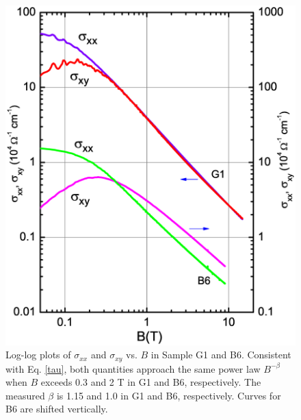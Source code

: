 \begin{figure}[!htbp]
  \begin{center}
\includegraphics[width=0.8\linewidth]{ch-na3bi/figures/FigLogSigxy}
\caption{\label{figCond} 
Log-log plots of $\sigma_{xx}$ and $\sigma_{xy}$ vs. $B$ in Sample G1 and B6. Consistent with Eq. \ref{tau}, both quantities approach the same power law $B^{-\beta}$ when $B$ exceeds 0.3 and 2 T in G1 and B6, respectively. The measured $\beta$ is 1.15 and 1.0 in G1 and B6, respectively. Curves for B6 are shifted vertically.
}
  \end{center}
\end{figure}



